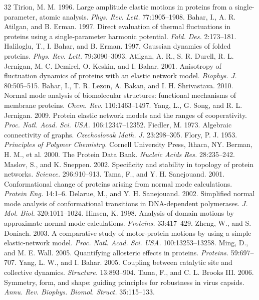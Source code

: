 \documentclass[11pt,onecolumn,letterpaper]{article}
\begin{document}
\begin{thebibliography}{32}
\footnotesize
\setlength{\itemsep}{2pt}
 Tirion, M. M. 1996. Large amplitude elastic motions in proteins from a single-parameter, atomic analysis. \textit{Phys. Rev. Lett.} 77:1905--1908.
 Bahar, I., A. R. Atilgan, and B. Erman. 1997. Direct evaluation of thermal fluctuations in proteins using a single-parameter harmonic potential. \textit{Fold. Des.} 2:173--181.
 Haliloglu, T., I. Bahar, and B. Erman. 1997. Gaussian dynamics of folded proteins. \textit{Phys. Rev. Lett.} 79:3090--3093.
 Atilgan, A. R., S. R. Durell, R. L. Jernigan, M. C. Demirel, O. Keskin, and I. Bahar. 2001. Anisotropy of fluctuation dynamics of proteins with an elastic network model. \textit{Biophys. J.} 80:505--515.
 Bahar, I., T. R. Lezon, A. Bakan, and I. H. Shrivastava. 2010. Normal mode analysis of biomolecular structures: functional mechanisms of membrane proteins. \textit{Chem. Rev.} 110:1463--1497.
 Yang, L., G. Song, and R. L. Jernigan. 2009. Protein elastic network models and the ranges of cooperativity. \textit{Proc. Natl. Acad. Sci. USA.} 106:12347--12352.
 Fiedler, M. 1973. Algebraic connectivity of graphs. \textit{Czechoslovak Math. J.} 23:298--305.
 Flory, P. J. 1953. \textit{Principles of Polymer Chemistry.} Cornell University Press, Ithaca, NY.
 Berman, H. M., et al. 2000. The Protein Data Bank. \textit{Nucleic Acids Res.} 28:235--242.
 Maslov, S., and K. Sneppen. 2002. Specificity and stability in topology of protein networks. \textit{Science.} 296:910--913.
 Tama, F., and Y. H. Sanejouand. 2001. Conformational change of proteins arising from normal mode calculations. \textit{Protein Eng.} 14:1--6.
 Delarue, M., and Y. H. Sanejouand. 2002. Simplified normal mode analysis of conformational transitions in DNA-dependent polymerases. \textit{J. Mol. Biol.} 320:1011--1024.
 Hinsen, K. 1998. Analysis of domain motions by approximate normal mode calculations. \textit{Proteins.} 33:417--429.
 Zheng, W., and S. Doniach. 2003. A comparative study of motor-protein motions by using a simple elastic-network model. \textit{Proc. Natl. Acad. Sci. USA.} 100:13253--13258.
 Ming, D., and M. E. Wall. 2005. Quantifying allosteric effects in proteins. \textit{Proteins.} 59:697--707.
 Yang, L. W., and I. Bahar. 2005. Coupling between catalytic site and collective dynamics. \textit{Structure.} 13:893--904.
 Tama, F., and C. L. Brooks III. 2006. Symmetry, form, and shape: guiding principles for robustness in virus capsids. \textit{Annu. Rev. Biophys. Biomol. Struct.} 35:115--133.

\end{thebibliography}
\end{document}
